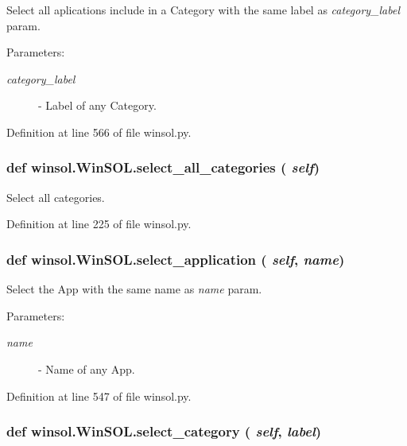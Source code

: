 Select all aplications include in a Category with the same label as {\em category\_\-label\/} param. 

\begin{Desc}
\item[Parameters:]
\begin{description}
\item[{\em category\_\-label}]- Label of any Category. \end{description}
\end{Desc}


Definition at line 566 of file winsol.py.\hypertarget{classwinsol_1_1WinSOL_0cdd751cd80ab94b10199b19e11a1b80}{
\subsubsection[select\_\-all\_\-categories]{\setlength{\rightskip}{0pt plus 5cm}def winsol.Win\-SOL.select\_\-all\_\-categories ( {\em self})}}
\label{classwinsol_1_1WinSOL_0cdd751cd80ab94b10199b19e11a1b80}


Select all categories. 



Definition at line 225 of file winsol.py.\hypertarget{classwinsol_1_1WinSOL_e72b39dfc299115e55f8e959da1dad57}{
\subsubsection[select\_\-application]{\setlength{\rightskip}{0pt plus 5cm}def winsol.Win\-SOL.select\_\-application ( {\em self},  {\em name})}}
\label{classwinsol_1_1WinSOL_e72b39dfc299115e55f8e959da1dad57}


Select the App with the same name as {\em name\/} param. 

\begin{Desc}
\item[Parameters:]
\begin{description}
\item[{\em name}]- Name of any App. \end{description}
\end{Desc}


Definition at line 547 of file winsol.py.\hypertarget{classwinsol_1_1WinSOL_52c8f729a96376d31040770bb6f870b4}{
\subsubsection[select\_\-category]{\setlength{\rightskip}{0pt plus 5cm}def winsol.Win\-SOL.select\_\-category ( {\em self},  {\em label})}}
\label{classwinsol_1_1WinSOL_52c8f729a96376d31040770bb6f870b4}


